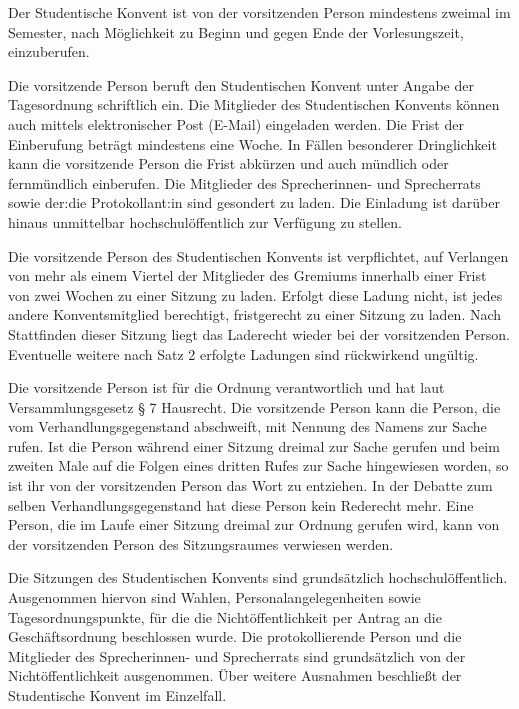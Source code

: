 \documentclass[10pt,a4paper]{scrartcl}
\begin{document}
\begin{contract}


\label{allgemeines-1}

  Der Studentische Konvent ist von der vorsitzenden Person mindestens
  zweimal im Semester, nach Möglichkeit zu Beginn und gegen Ende der
  Vorlesungszeit, einzuberufen.

  Die vorsitzende Person beruft den Studentischen Konvent unter Angabe
  der Tagesordnung schriftlich ein. Die Mitglieder des Studentischen
  Konvents können auch mittels elektronischer Post (E-Mail) eingeladen
  werden. Die Frist der Einberufung beträgt mindestens eine Woche. In
  Fällen besonderer Dringlichkeit kann die vorsitzende Person die Frist
  abkürzen und auch mündlich oder fernmündlich einberufen. Die
  Mitglieder des Sprecherinnen- und Sprecherrats sowie der:die
  Protokollant:in sind gesondert zu laden. Die Einladung ist darüber
  hinaus unmittelbar hochschulöffentlich zur Verfügung zu stellen.

  Die vorsitzende Person des Studentischen Konvents ist verpflichtet,
  auf Verlangen von mehr als einem Viertel der Mitglieder des Gremiums
  innerhalb einer Frist von zwei Wochen zu einer Sitzung zu laden.
  Erfolgt diese Ladung nicht, ist jedes andere Konventsmitglied
  berechtigt, fristgerecht zu einer Sitzung zu laden. Nach Stattfinden
  dieser Sitzung liegt das Laderecht wieder bei der vorsitzenden Person.
  Eventuelle weitere nach Satz 2 erfolgte Ladungen sind rückwirkend
  ungültig.

  Die vorsitzende Person ist für die Ordnung verantwortlich und hat laut
  Versammlungsgesetz § 7 Hausrecht. Die vorsitzende Person kann die
  Person, die vom Verhandlungsgegenstand abschweift, mit Nennung des
  Namens zur Sache rufen. Ist die Person während einer Sitzung dreimal
  zur Sache gerufen und beim zweiten Male auf die Folgen eines dritten
  Rufes zur Sache hingewiesen worden, so ist ihr von der vorsitzenden
  Person das Wort zu entziehen. In der Debatte zum selben
  Verhandlungsgegenstand hat diese Person kein Rederecht mehr. Eine
  Person, die im Laufe einer Sitzung dreimal zur Ordnung gerufen wird,
  kann von der vorsitzenden Person des Sitzungsraumes verwiesen werden.

  Die Sitzungen des Studentischen Konvents sind grundsätzlich
  hochschulöffentlich. Ausgenommen hiervon sind Wahlen,
  Personalangelegenheiten sowie Tagesordnungspunkte, für die die
  Nichtöffentlichkeit per Antrag an die Geschäftsordnung beschlossen
  wurde. Die protokollierende Person und die Mitglieder des
  Sprecherinnen- und Sprecherrats sind grundsätzlich von der
  Nichtöffentlichkeit ausgenommen. Über weitere Ausnahmen beschließt der
  Studentische Konvent im Einzelfall.


\end{contract}
\end{document}
